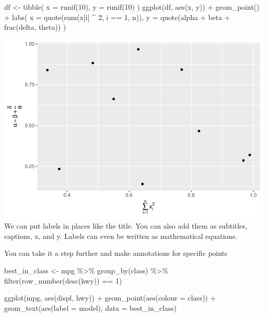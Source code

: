 \documentclass[
]{article}
\newenvironment{Shaded}{\begin{snugshade}}{\end{snugshade}}
\newcommand{\AttributeTok}[1]{\textcolor[rgb]{0.77,0.63,0.00}{#1}}
\newcommand{\DecValTok}[1]{\textcolor[rgb]{0.00,0.00,0.81}{#1}}
\newcommand{\FunctionTok}[1]{\textcolor[rgb]{0.00,0.00,0.00}{#1}}
\newcommand{\NormalTok}[1]{#1}
\newcommand{\OtherTok}[1]{\textcolor[rgb]{0.56,0.35,0.01}{#1}}
\newcommand{\SpecialCharTok}[1]{\textcolor[rgb]{0.00,0.00,0.00}{#1}}
\begin{document}
\begin{Shaded}
\begin{Highlighting}[]
\NormalTok{df }\OtherTok{\textless{}{-}} \FunctionTok{tibble}\NormalTok{(}
  \AttributeTok{x =} \FunctionTok{runif}\NormalTok{(}\DecValTok{10}\NormalTok{),}
  \AttributeTok{y =} \FunctionTok{runif}\NormalTok{(}\DecValTok{10}\NormalTok{)}
\NormalTok{)}
\FunctionTok{ggplot}\NormalTok{(df, }\FunctionTok{aes}\NormalTok{(x, y)) }\SpecialCharTok{+}
  \FunctionTok{geom\_point}\NormalTok{() }\SpecialCharTok{+}
  \FunctionTok{labs}\NormalTok{(}
    \AttributeTok{x =} \FunctionTok{quote}\NormalTok{(}\FunctionTok{sum}\NormalTok{(x[i] }\SpecialCharTok{\^{}} \DecValTok{2}\NormalTok{, i }\SpecialCharTok{==} \DecValTok{1}\NormalTok{, n)),}
    \AttributeTok{y =} \FunctionTok{quote}\NormalTok{(alpha }\SpecialCharTok{+}\NormalTok{ beta }\SpecialCharTok{+} \FunctionTok{frac}\NormalTok{(delta, theta))}
\NormalTok{  )}
\end{Highlighting}
\end{Shaded}

\includegraphics{Journal_files/figure-latex/unnamed-chunk-57-4.pdf} We
can put labels in places like the title. You can also add them as
subtitles, captions, x, and y. Labels can even be written as
mathematical equations.

You can take it a step further and make annotations for specific points

\begin{Shaded}
\begin{Highlighting}[]
\NormalTok{best\_in\_class }\OtherTok{\textless{}{-}}\NormalTok{ mpg }\SpecialCharTok{\%\textgreater{}\%}
  \FunctionTok{group\_by}\NormalTok{(class) }\SpecialCharTok{\%\textgreater{}\%}
  \FunctionTok{filter}\NormalTok{(}\FunctionTok{row\_number}\NormalTok{(}\FunctionTok{desc}\NormalTok{(hwy)) }\SpecialCharTok{==} \DecValTok{1}\NormalTok{)}

\FunctionTok{ggplot}\NormalTok{(mpg, }\FunctionTok{aes}\NormalTok{(displ, hwy)) }\SpecialCharTok{+}
  \FunctionTok{geom\_point}\NormalTok{(}\FunctionTok{aes}\NormalTok{(}\AttributeTok{colour =}\NormalTok{ class)) }\SpecialCharTok{+}
  \FunctionTok{geom\_text}\NormalTok{(}\FunctionTok{aes}\NormalTok{(}\AttributeTok{label =}\NormalTok{ model), }\AttributeTok{data =}\NormalTok{ best\_in\_class)}
\end{Highlighting}
\end{Shaded}
\end{document}
